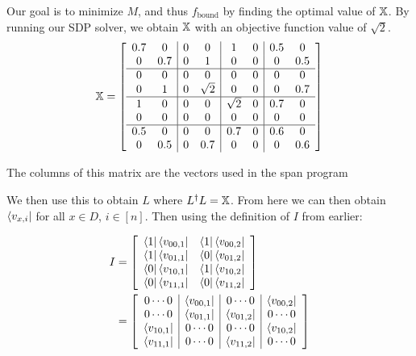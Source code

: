 Our goal is to minimize $M$, and thus $f_{\text{bound}}$ by finding the optimal value of $\operatorname{\mathbb{X}}$. By running our SDP solver, we obtain $\operatorname{\mathbb{X}}$ with an objective function value of $\sqrt{2}$.
\begin{align}
    \operatorname{\mathbb{X}} = \left[ \begin{array}{cc|cc|cc|cc}
    0.7 & 0 & 0 & 0 & 1 & 0 & 0.5 & 0\\
    0 & 0.7 & 0 & 1 & 0 & 0 & 0 & 0.5\\
    \hline
    0 & 0 & 0 & 0 & 0 & 0 & 0 & 0\\
    0 & 1 & 0 & \sqrt{2} & 0 & 0 & 0 & 0.7\\
    \hline
    1 & 0 & 0 & 0 & \sqrt{2} & 0 & 0.7 & 0\\
    0 & 0 & 0 & 0 & 0 & 0 & 0 & 0\\
    \hline
    0.5 & 0 & 0 & 0 & 0.7 & 0 & 0.6 & 0\\
    0 & 0.5 & 0 & 0.7 & 0 & 0 & 0 & 0.6\\
    \end{array}
\right] \nonumber
\end{align}

The columns of this matrix are the vectors used in the span program 

We then use this to obtain $L$ where $L^\dagger L = \operatorname{\mathbb{X}}$. From here we can then obtain $\bra{v_{x,i}}$ for all $x \in D$, $i \in [n]$. Then using the definition of $I$ from earlier:

\begin{align}
I &= \left[\begin{array}{cc}
    \bra{1}\bra{v_{00,1}} & \bra{1}\bra{v_{00,2}} \\
    \bra{1}\bra{v_{01,1}} & \bra{0}\bra{v_{01,2}} \\
    \bra{0}\bra{v_{10,1}} & \bra{1}\bra{v_{10,2}}\\
    \bra{0}\bra{v_{11,1}} & \bra{0}\bra{v_{11,2}}\\
\end{array} \right] \nonumber \\
&= \left[\begin{array}{c|c|c|c}
    0 \cdots 0 & \bra{v_{00,1}} & 0 \cdots 0 & \bra{v_{00,2}} \\
    0 \cdots 0 & \bra{v_{01,1}} & \bra{v_{01,2}} & 0 \cdots 0\\
    \bra{v_{10,1}} & 0 \cdots 0 & 0 \cdots 0 & \bra{v_{10,2}}\\
    \bra{v_{11,1}} & 0 \cdots 0 & \bra{v_{11,2}} & 0 \cdots 0\\
\end{array} \right] \nonumber
\end{align}

